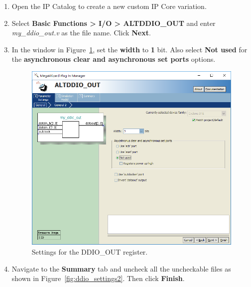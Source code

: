 \documentclass[11pt, twoside, pdftex]{article}
\begin{document}
\begin{enumerate}
	\item Open the IP Catalog to create a new custom IP Core variation.
	\item Select {\bf Basic Functions > I/O > ALTDDIO\_OUT} and enter {\it my\_ddio\_out.v} as the file name. Click {\bf Next}.
	\item In the window in Figure~\ref{fig:ddio_settings}, set the {\bf width} to {\bf 1} bit.  Also select {\bf Not used} for the {\bf asynchronous clear and asynchronous set ports} options.

	\begin{figure}[H]
		\centering
		  \includegraphics[scale=0.6]{figures/ddio_settings.png}
		\caption{Settings for the DDIO\_OUT register.} 
		\label{fig:ddio_settings}
	\end{figure}

	\item Navigate to the {\bf Summary} tab and uncheck all the uncheckable files as shown in Figure~\ref{fig:ddio_settings2}. Then click {\bf Finish}.
\end{enumerate}
\end{document}
